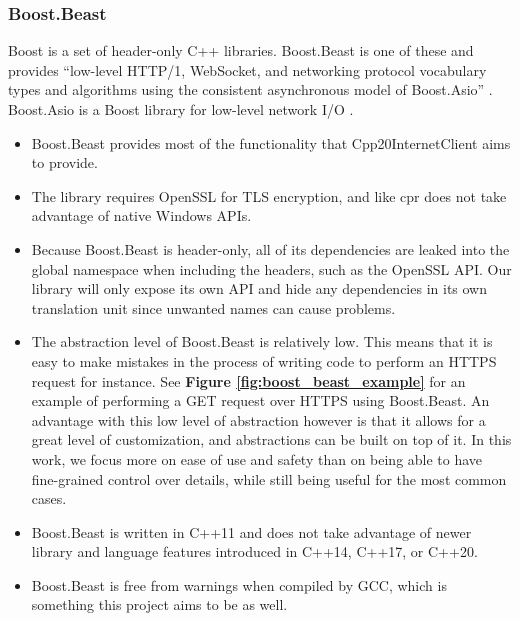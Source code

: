 \documentclass[12pt, a4paper]{article}
\begin{document}
\subsubsection{Boost.Beast}
Boost is a set of header-only C++ libraries. Boost.Beast is one of these and provides “low-level HTTP/1, WebSocket, and networking protocol vocabulary types and algorithms using the consistent asynchronous model of Boost.Asio” \parencite{BoostBeast}. Boost.Asio is a Boost library for low-level network I/O \parencite{BoostAsio}.
\begin{itemize}
	\item Boost.Beast provides most of the functionality that Cpp20InternetClient aims to provide.
	\item The library requires OpenSSL for TLS encryption, and like cpr does not take advantage of native Windows APIs.
	\item Because Boost.Beast is header-only, all of its dependencies are leaked into the global namespace when including the headers, such as the OpenSSL API. Our library will only expose its own API and hide any dependencies in its own translation unit since unwanted names can cause problems.
	\item The abstraction level of Boost.Beast is relatively low. This means that it is easy to make mistakes in the process of writing code to perform an HTTPS request for instance. See \textbf{Figure \ref{fig:boost_beast_example}} for an example of performing a GET request over HTTPS using Boost.Beast. An advantage with this low level of abstraction however is that it allows for a great level of customization, and abstractions can be built on top of it. In this work, we focus more on ease of use and safety than on being able to have fine-grained control over details, while still being useful for the most common cases.
	\item Boost.Beast is written in C++11 and does not take advantage of newer library and language features introduced in C++14, C++17, or C++20.
	\item Boost.Beast is free from warnings when compiled by GCC, which is something this project aims to be as well.
\end{itemize}
\end{document}
